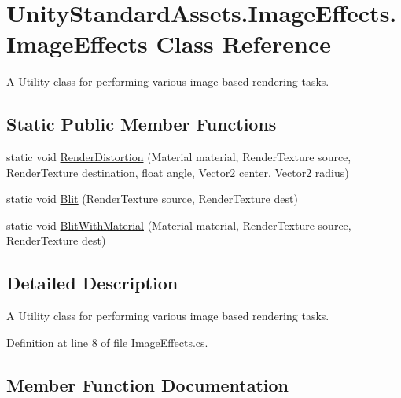 \hypertarget{class_unity_standard_assets_1_1_image_effects_1_1_image_effects}{}\section{Unity\+Standard\+Assets.\+Image\+Effects.\+Image\+Effects Class Reference}
\label{class_unity_standard_assets_1_1_image_effects_1_1_image_effects}


A Utility class for performing various image based rendering tasks.  


\subsection*{Static Public Member Functions}
\begin{DoxyCompactItemize}
\item 
static void \mbox{\hyperlink{class_unity_standard_assets_1_1_image_effects_1_1_image_effects_ad4557264b78d34379449952065aab703}{Render\+Distortion}} (Material material, Render\+Texture source, Render\+Texture destination, float angle, Vector2 center, Vector2 radius)
\item 
static void \mbox{\hyperlink{class_unity_standard_assets_1_1_image_effects_1_1_image_effects_a82a64f2e82d876bead66b76ac372f916}{Blit}} (Render\+Texture source, Render\+Texture dest)
\item 
static void \mbox{\hyperlink{class_unity_standard_assets_1_1_image_effects_1_1_image_effects_ab20941a3216980c86da8a596ce4ebcf6}{Blit\+With\+Material}} (Material material, Render\+Texture source, Render\+Texture dest)
\end{DoxyCompactItemize}


\subsection{Detailed Description}
A Utility class for performing various image based rendering tasks. 

Definition at line 8 of file Image\+Effects.\+cs.



\subsection{Member Function Documentation}
\mbox{\label{class_unity_standard_assets_1_1_image_effects_1_1_image_effects_a82a64f2e82d876bead66b76ac372f916}} 
